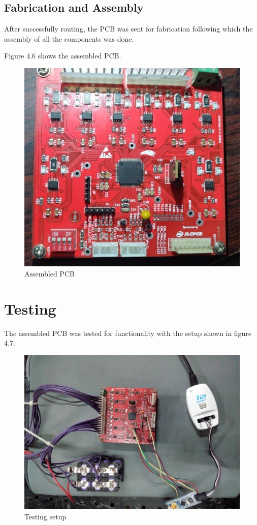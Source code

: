 \subsection{Fabrication and Assembly}

After successfully routing, the PCB was sent for fabrication following which the assembly of all the components was done.

Figure 4.6 shows the assembled PCB.
\begin{figure}[H]
    \centering
    \includegraphics[scale=0.8]{Chapter4/assembly.jpg}
    \caption{Assembled PCB}
\end{figure}

\section{Testing}

The assembled PCB was tested for functionality  with the setup shown in figure 4.7.
\begin{figure}[H]
    \centering
    \includegraphics[scale=0.1]{Chapter4/IMG_20210110_205116558 (2).jpg}
    \caption{Testing setup}
\end{figure}

